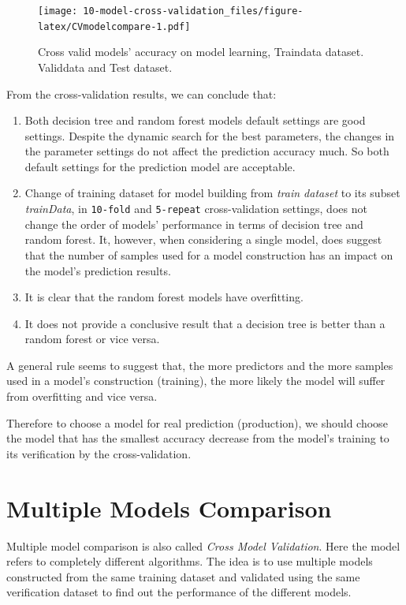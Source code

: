 \documentclass[
]{book}
\providecommand{\tightlist}{%
  \setlength{\itemsep}{0pt}\setlength{\parskip}{0pt}}
\begin{document}
\begin{figure}
\centering
\texttt{[image: 10-model-cross-validation\_files/figure-latex/CVmodelcompare-1.pdf]}
\caption{\label{fig:CVmodelcompare}Cross valid models' accuracy on model learning, Traindata dataset. Validdata and Test dataset.}
\end{figure}

From the cross-validation results, we can conclude that:

\begin{enumerate}
\def\labelenumi{\arabic{enumi}.}
\tightlist
\item
  Both decision tree and random forest models default settings are good settings. Despite the dynamic search for the best parameters, the changes in the parameter settings do not affect the prediction accuracy much. So both default settings for the prediction model are acceptable.
\item
  Change of training dataset for model building from \emph{train dataset} to its subset \emph{trainData}, in \texttt{10-fold} and \texttt{5-repeat} cross-validation settings, does not change the order of models' performance in terms of decision tree and random forest. It, however, when considering a single model, does suggest that the number of samples used for a model construction has an impact on the model's prediction results.
\item
  It is clear that the random forest models have overfitting.
\item
  It does not provide a conclusive result that a decision tree is better than a random forest or vice versa.
\end{enumerate}

A general rule seems to suggest that, the more predictors and the more samples used in a model's construction (training), the more likely the model will suffer from overfitting and vice versa.

Therefore to choose a model for real prediction (production), we should choose the model that has the smallest accuracy decrease from the model's training to its verification by the cross-validation.

\hypertarget{multiple-models-comparison}{%
\section{Multiple Models Comparison}\label{multiple-models-comparison}}

Multiple model comparison is also called \emph{Cross Model Validation}. Here the model refers to completely different algorithms. The idea is to use multiple models constructed from the same training dataset and validated using the same verification dataset to find out the performance of the different models.
\end{document}
